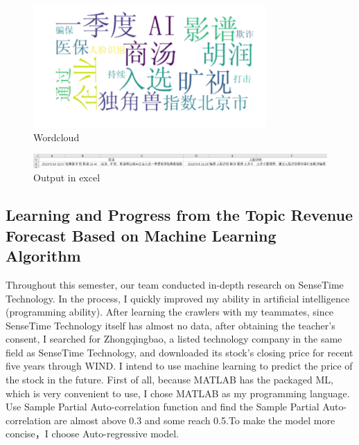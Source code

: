 \documentclass{article}
\begin{document}
\begin{figure}[htb]
	\centering
	\includegraphics[width=3.5in]{word_cloud.png}
	\caption{Wordcloud}
\end{figure}

\begin{figure}[htb]
	\centering
	\includegraphics[width=5in]{output_excel.png}
	\caption{Output in excel}
\end{figure}
\subsection{Learning and Progress from the Topic Revenue Forecast Based on Machine Learning Algorithm}
Throughout this semester, our team conducted in-depth research on SenseTime Technology. In the process, I quickly improved my ability in artificial intelligence (programming ability). After learning the crawlers with my teammates, since SenseTime Technology itself has almost no data, after obtaining the teacher's consent, I searched for Zhongqingbao, a listed technology company in the same field as SenseTime Technology, and downloaded its stock’s closing price for recent five years through WIND. I intend to use machine learning to predict the price of the stock in the future. First of all, because MATLAB has the packaged ML, which is very convenient to use, I chose MATLAB as my programming language. Use Sample Partial Auto-correlation function and find the Sample Partial Auto-correlation are almost above 0.3 and some reach 0.5.To make the model more concise，I choose Auto-regressive model. 
\end{document}
